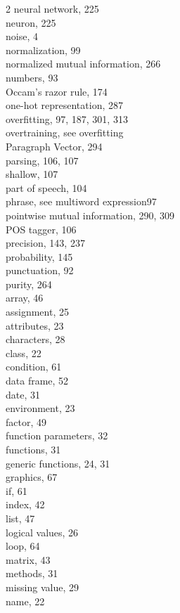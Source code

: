 \documentclass[twoside,11pt]{book}
\begin{document}
\begin{multicols}{2}
neural network, 225\\
neuron, 225\\
noise, 4\\
normalization, 99\\
normalized mutual information, 266\\
numbers, 93\\
Occam's razor rule, 174\\
one-hot representation, 287\\
overfitting, 97, 187, 301, 313\\
overtraining, see overfitting\\
Paragraph Vector, 294\\
parsing, 106, 107\\
shallow, 107\\
part of speech, 104\\
phrase, see multiword expression97\\
pointwise mutual information, 290, 309\\
POS tagger, 106\\
precision, 143, 237\\
probability, 145\\
punctuation, 92\\
purity, 264\\
array, 46\\
assignment, 25\\
attributes, 23\\
characters, 28\\
class, 22\\
condition, 61\\
data frame, 52\\
date, 31\\
environment, 23\\
factor, 49\\
function parameters, 32\\
functions, 31\\
generic functions, 24, 31\\
graphics, 67\\
if, 61\\
index, 42\\
list, 47\\
logical values, 26\\
loop, 64\\
matrix, 43\\
methods, 31\\
missing value, 29\\
name, 22\\

\end{multicols}
\end{document}
